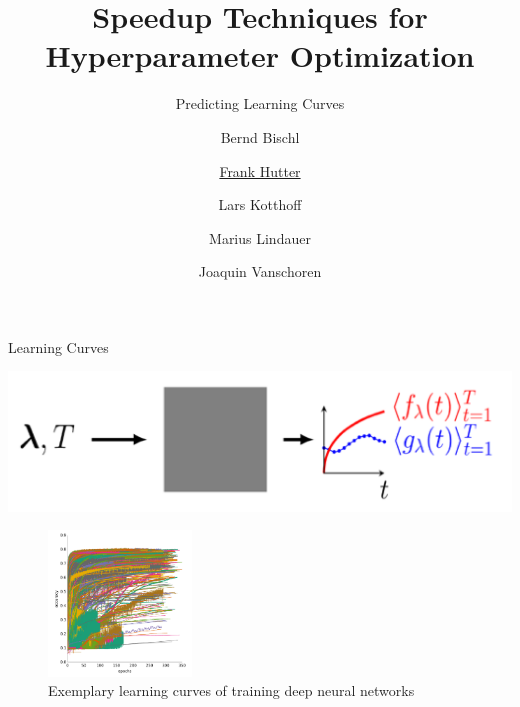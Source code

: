 

\title{Speedup Techniques for Hyperparameter Optimization}
\subtitle{Predicting Learning Curves}
\author[Frank Hutter]{Bernd Bischl \and \underline{Frank Hutter} \and Lars Kotthoff\newline \and Marius Lindauer \and Joaquin Vanschoren}
\institute{}
\date{}




\maketitle


\begin{frame}{Learning Curves}
\begin{center}
\includegraphics[width=0.4\linewidth, keepaspectratio=true]{images/intro/graybox_optimization.png}
\end{center}

\begin{figure}
   \centering
   \includegraphics[width=0.34\textwidth]{../w07_hpo_speedup/images/learningcurve/learning_curve_domhan.png}
   \caption{Exemplary learning curves of training deep neural networks}
\end{figure}
\end{frame}

